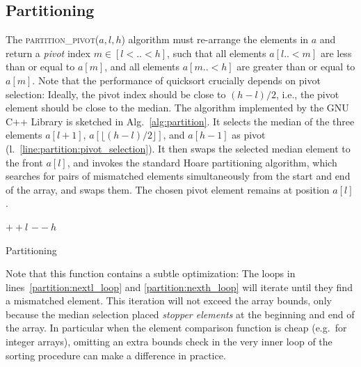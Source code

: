 \documentclass[sigplan,10pt,anonymous,review]{acmart}\settopmatter{printfolios=true,printccs=false,printacmref=false}
\theoremstyle{definition}
\begin{document}
  \subsection{Partitioning}
  The \textsc{partition\_pivot($a,l,h$)} algorithm must re-arrange the elements in $a$ and return a \emph{pivot} index $m\in[l{<}{..}{<}h]$, such
  that all elements $a[l{..}{<}m]$ are less than or equal to $a[m]$, and all elements $a[m{..}{<}h]$ are greater than or equal to $a[m]$.
  Note that the performance of quicksort crucially depends on pivot selection: Ideally, the pivot index should be close to $(h-l)/2$,
  i.e., the pivot element should be close to the median. The algorithm implemented by the GNU C++ Library is sketched in Alg.~\ref{alg:partition}.
  It selects the median of the three elements $a[l+1]$, $a[\lfloor (h-l)/2 \rfloor]$, and $a[h-1]$ as pivot (l.~\ref{line:partition:pivot_selection}).
  It then swaps the selected median element to the front $a[l]$, and invokes the standard Hoare partitioning algorithm,
  which searches for pairs of mismatched elements simultaneously from the start and end of the array, and swaps them.
  The chosen pivot element remains at position $a[l]$.
  \begin{algorithm}
  \begin{algorithmic}[1]
         ${+}{+}l$ \EndWhile \label{partition:nextl_loop}
         ${-}{-}h$ \EndWhile \label{partition:nexth_loop}
         \EndIf
      \EndWhile
    \EndFunction

       \label{line:partition:pivot_selection}
    \EndFunction
  \end{algorithmic}
  \caption{Partitioning}\label{alg:partition}
  \end{algorithm}

  Note that this function contains a subtle optimization: The loops in lines~\ref{partition:nextl_loop} and \ref{partition:nexth_loop}
  will iterate until they find a mismatched element. This iteration will not exceed the array bounds, only because the median selection
  placed \emph{stopper elements} at the beginning and end of the array. In particular when the element comparison function is
  cheap (e.g.\ for integer arrays), omitting an extra bounds check in the very inner loop of the sorting procedure can make a difference in practice.
\end{document}

